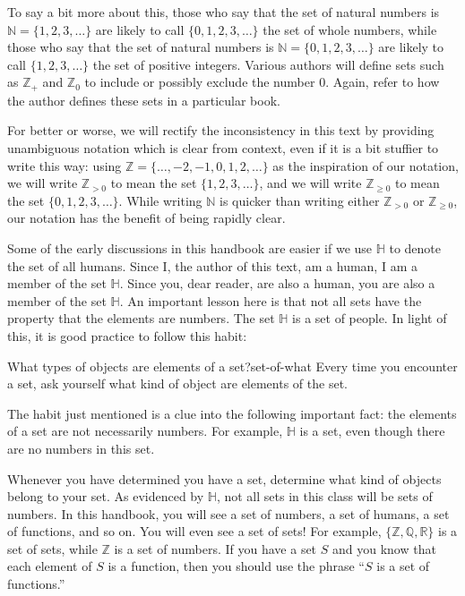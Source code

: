 \documentclass{book}
\theoremstyle{ekimcustom}
\begin{document}
To say a bit more about this, those who say that the set of natural numbers is $\mathbb{N} = \{1,2,3,\dots\}$ are likely to call $\{0,1,2,3,\dots\}$ the set of whole numbers, while those who say that the set of natural numbers is $\mathbb{N} = \{0,1,2,3,\dots\}$ are likely to call $\{1,2,3,\dots\}$ the set of positive integers. Various authors will define sets such as $\mathbb{Z}_+$ and $\mathbb{Z}_0$ to include or possibly exclude the number $0$. Again, refer to how the author defines these sets in a particular book.

For better or worse, we will rectify the inconsistency in this text by providing unambiguous notation which is clear from context, even if it is a bit stuffier to write this way: using $\mathbb{Z} = \{\dots,-2,-1,0,1,2,\dots\}$ as the inspiration of our notation, we will write $\mathbb{Z}_{>0}$ to mean the set $\{1,2,3,\dots\}$, and we will write $\mathbb{Z}_{\geq 0}$ to mean the set $\{0,1,2,3,\dots\}$. While writing $\mathbb{N}$ is quicker than writing either $\mathbb{Z}_{>0}$ or $\mathbb{Z}_{\geq 0}$, our notation has the benefit of being rapidly clear.

Some of the early discussions in this handbook are easier if we use $\mathbb{H}$ to denote the set of all humans. Since I, the author of this text, am a human, I am a member of the set $\mathbb{H}$. Since you, dear reader, are also a human, you are also a member of the set $\mathbb{H}$. An important lesson here is that not all sets have the property that the elements are numbers. The set $\mathbb{H}$ is a set of people. In light of this, it is good practice to follow this habit:
\begin{bhabit}{What types of objects are elements of a set?}{set-of-what}
Every time you encounter a set, ask yourself what kind of object are elements of the set.
\end{bhabit}
The habit just mentioned is a clue into the following important fact: the elements of a set are not necessarily numbers. For example, $\mathbb{H}$ is a set, even though there are no numbers in this set.

Whenever you have determined you have a set, determine what kind of objects belong to your set. As evidenced by $\mathbb{H}$, not all sets in this class will be sets of numbers. In this handbook, you will see a set of numbers, a set of humans, a set of functions, and so on. You will even see a set of sets! For example, $\{\mathbb{Z},\mathbb{Q},\mathbb{R}\}$ is a set of sets, while $\mathbb{Z}$ is a set of numbers. If you have a set $S$ and you know that each element of $S$ is a function, then you should use the phrase ``$S$ is a set of functions.''
\end{document}
